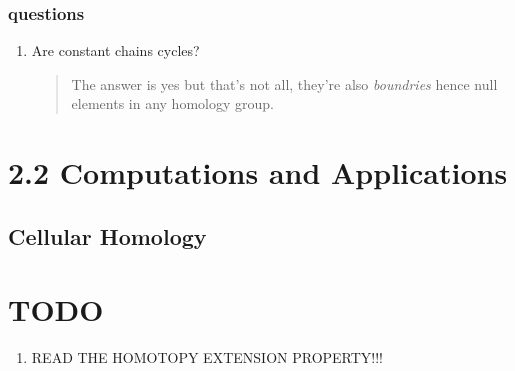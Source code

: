 \documentclass{pset}
\begin{document}
\subsubsection{questions}
\begin{enumerate}[label=\arabic*.]
    \item Are constant chains cycles?
    \begin{quote}
        The answer is yes but that's not all, they're also \emph{boundries} hence null elements in any homology group.
    \end{quote}
\end{enumerate}
\section{2.2 Computations and Applications}
\subsection{Cellular Homology}

\section{TODO}
\begin{enumerate}
	\item READ THE HOMOTOPY EXTENSION PROPERTY!!!
\end{enumerate}
\end{document}
